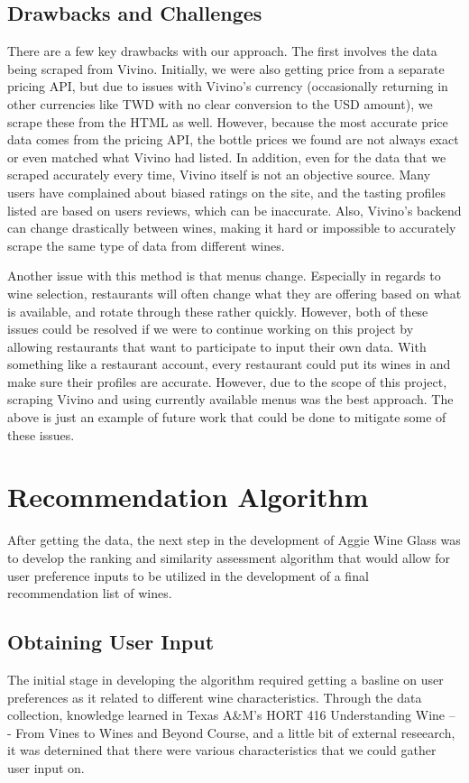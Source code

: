 \documentclass{article} %
\begin{document}
\subsection{Drawbacks and Challenges}

There are a few key drawbacks with our approach. The first involves the data being scraped from Vivino. Initially, we were also getting price from a separate pricing API, but due to issues with Vivino's currency (occasionally returning in other currencies like TWD with no clear conversion to the USD amount), we scrape these from the HTML as well. However, because the most accurate price data comes from the pricing API, the bottle prices we found are not always exact or even matched what Vivino had listed. In addition, even for the data that we scraped accurately every time, Vivino itself is not an objective source. Many users have complained about biased ratings on the site, and the tasting profiles listed are based on users reviews, which can be inaccurate. Also, Vivino's backend can change drastically between wines, making it hard or impossible to accurately scrape the same type of data from different wines.

Another issue with this method is that menus change. Especially in regards to wine selection, restaurants will often change what they are offering based on what is available, and rotate through these rather quickly. However, both of these issues could be resolved if we were to continue working on this project by allowing restaurants that want to participate to input their own data. With something like a restaurant account, every restaurant could put its wines in and make sure their profiles are accurate. However, due to the scope of this project, scraping Vivino and using currently available menus was the best approach. The above is just an example of future work that could be done to mitigate some of these issues.

\section{Recommendation Algorithm}

After getting the data, the next step in the development of Aggie Wine Glass was to develop the ranking and similarity assessment algorithm that would allow for user preference inputs to be utilized in the development of a final recommendation list of wines. 

\subsection{Obtaining User Input}
The initial stage in developing the algorithm required getting a basline on user preferences as it related to different wine characteristics. Through the data collection, knowledge learned in Texas A\&M's HORT 416 Understanding Wine -- - From Vines to Wines and Beyond Course, and a little bit of external reseearch, it was deternined that there were various characteristics that we could gather user input on.
\end{document}
